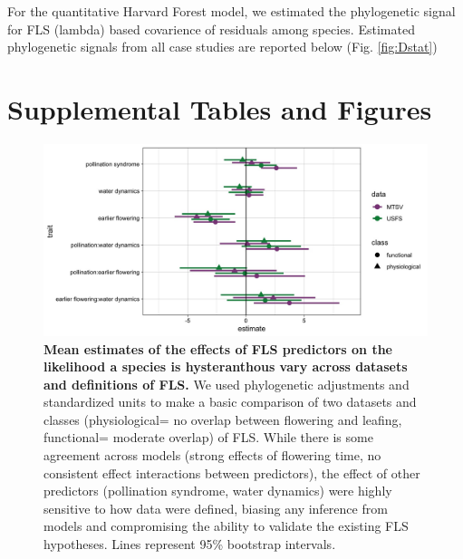 \documentclass{article}\usepackage[]{graphicx}\usepackage[]{color}
\begin{document}
{\noindent For the quantitative Harvard Forest model, we estimated the phylogenetic signal for FLS (lambda) based  covarience of residuals among species. Estimated phylogenetic signals from all case studies are reported below (Fig. \ref{fig:Dstat})  %

\section*{Supplemental Tables and Figures}

\begin{figure}[h!]
    \centering
 \includegraphics[width=\textwidth]{..//MTSV_USFS.jpeg} 
    \caption{\textbf{Mean estimates of the effects of FLS predictors on the likelihood a species is hysteranthous vary across datasets and definitions of FLS.}  We used phylogenetic adjustments and standardized units to make a basic comparison of two datasets and classes (physiological= no overlap between flowering and leafing, functional= moderate overlap) of FLS. While there is some agreement across models (strong effects of flowering time, no consistent effect interactions between predictors), the effect of other predictors (pollination syndrome, water dynamics) were highly sensitive to how data were defined, biasing any inference from models and compromising the ability to validate the existing FLS hypotheses. Lines represent 95\% bootstrap intervals.}
    \label{fig:muplots.USMT}
\end{figure}

}
\end{document}
